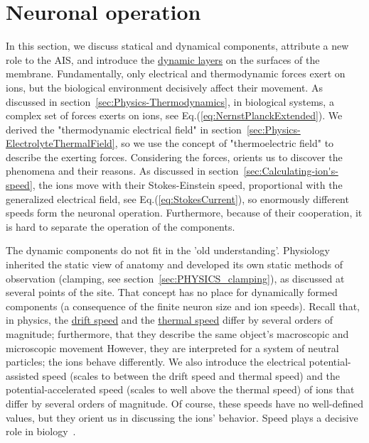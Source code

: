 
\section[Neuronal operation]{Neuronal operation\label{sec:Physics-MembranesChannels}\label{sec:Physics-Components}}


In this section, we discuss statical and dynamical
components, attribute a new role to the 
\gls{AIS}, and introduce the \hyperlink{DynamicLayer}{dynamic layers} on the surfaces of the membrane.
Fundamentally, only electrical and thermodynamic forces exert on ions,
but the biological environment decisively affect their movement.
As discussed in section~\ref{sec:Physics-Thermodynamics}, in biological systems, a complex set of forces exerts on ions, see Eq.(\ref{eq:NernstPlanckExtended}). 
We derived the "thermodynamic electrical field" in section~\ref{sec:Physics-ElectrolyteThermalField}, so we use the
concept of "thermoelectric field" to describe the exerting forces.
Considering the forces, 
orients us to discover the phenomena and their reasons. 
As discussed in section~\ref{sec:Calculating-ion's-speed}, 
the ions move with their Stokes-Einstein speed, proportional with
the generalized electrical field, see Eq.(\ref{eq:StokesCurrent}),
so enormously different speeds form the neuronal operation.
Furthermore, because of their cooperation, it is hard to separate the 
operation of the components.

The dynamic components do not fit in the 'old understanding'.
Physiology inherited the static view of anatomy and developed
its own static methods of observation (clamping, see section~\ref{sec:PHYSICS_clamping}), as discussed at several 
points of the site. That concept has no place for dynamically
formed components (a consequence of the finite neuron size and ion speeds).
Recall that, in physics, the \href{https://en.wikipedia.org/wiki/Drift_velocity}{drift speed} and the \href{https://en.wikipedia.org/wiki/Thermal_velocity}{thermal speed} differ by several orders of magnitude; furthermore, that they describe the same object's macroscopic and microscopic movement
However, they are interpreted for a system of neutral particles; the ions
behave differently. We also introduce the electrical \gls{potential-assisted speed}
(scales to between the drift speed and thermal speed)
and the \gls{potential-accelerated speed} (scales to well above the thermal speed) of
ions that differ by  several orders of magnitude.
Of course, these speeds have no well-defined values,
but they orient us in discussing the ions' behavior.
Speed plays a decisive role in biology~\cite{RoleOfInformationTransferSpeed:2022}.


